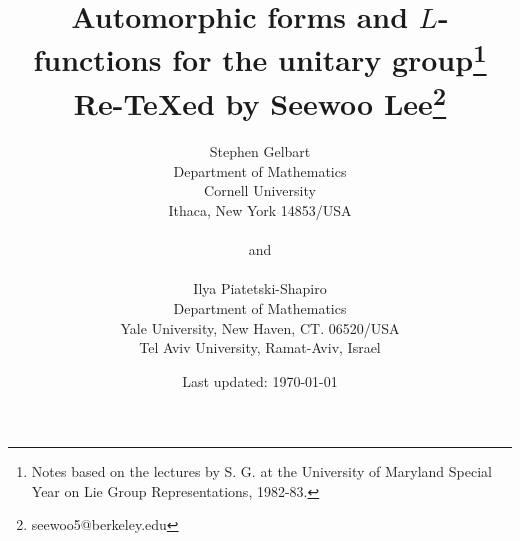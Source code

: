 \documentclass[letterpaper, 12pt]{article}
\newcommand{\1}{\mathds{1}}	%
\theoremstyle{definition}
\begin{document}

\title{Automorphic forms and $L$-functions for the unitary group\footnote{Notes based on the lectures by S. G. at the University of Maryland Special Year on Lie Group Representations, 1982-83.} \\[1em]
\normalsize Re-\TeX ed by Seewoo Lee\footnote{seewoo5@berkeley.edu}}


\author{Stephen Gelbart \\ Department of Mathematics \\ Cornell University \\ Ithaca, New York 14853/USA \\ \\ and \\  \\ Ilya Piatetski-Shapiro \\ Department of Mathematics \\ Yale University, New Haven, CT. 06520/USA \\ Tel Aviv University, Ramat-Aviv, Israel}
\date{\normalsize\vspace{-1ex} Last updated: \today}


\maketitle


% 







\setcounter{tocdepth}{1}
\tableofcontents\label{sec:contents}





\nocite{*}









\end{document}
